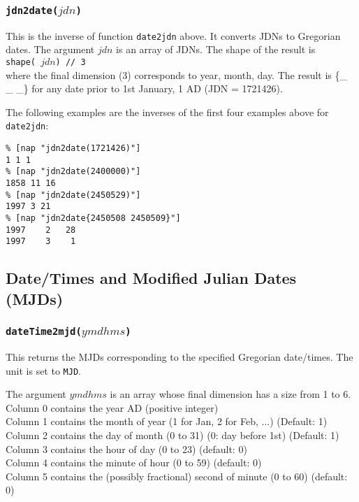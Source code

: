       \subsubsection{
        \label{jdn2date} \texttt{jdn2date(}$jdn$\texttt{)}
      }
This is the inverse of function 
      \texttt{date2jdn} above. It converts JDNs to Gregorian dates.
      The argument 
      $jdn$ is an array of JDNs. The shape of the result is
      \\
      \texttt{shape( 
      $jdn$) // 3}
      \\where the final dimension (3) corresponds to year, month,
      day. The result is \{\_ \_ \_\} for any date prior to 1st January, 1
      AD (JDN = 1721426).
      

The following examples are the inverses of the first four
      examples above for 
      \texttt{date2jdn}:
      \begin{verbatim}
% [nap "jdn2date(1721426)"]
1 1 1
% [nap "jdn2date(2400000)"]
1858 11 16
% [nap "jdn2date(2450529)"]
1997 3 21
% [nap "jdn2date{2450508 2450509}"]
1997    2   28
1997    3    1
\end{verbatim}

      \subsection{
        \label{mjd}Date/Times and Modified Julian Dates (MJDs)
      }

      \subsubsection{
        \label{dateTime2mjd} \texttt{dateTime2mjd(}$ymdhms$\texttt{)}
      }
This returns the MJDs corresponding to the specified
      Gregorian date/times. The unit is set to 
      \texttt{MJD}.
      

The argument 
      $ymdhms$ is an array whose final dimension has a size
      from 1 to 6.
      \\Column 0 contains the year AD (positive integer)
      \\Column 1 contains the month of year (1 for Jan, 2 for Feb,
      ...) (Default: 1)
      \\Column 2 contains the day of month (0 to 31) (0: day before
      1st) (Default: 1)
      \\Column 3 contains the hour of day (0 to 23) (default: 0)
      \\Column 4 contains the minute of hour (0 to 59) (default: 0)
      \\Column 5 contains the (possibly fractional) second of
      minute (0 to 60) (default: 0)
      

